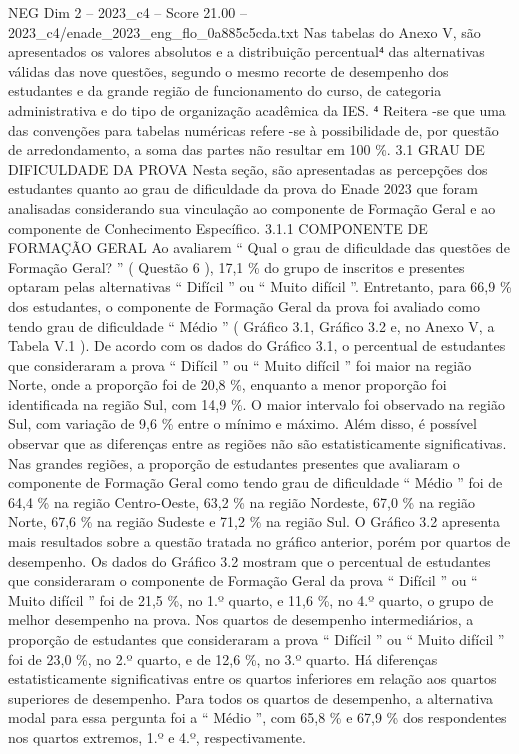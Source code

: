 \begin{textsample}{NEG Dim 2 – 2023\_c4 – Score 21.00 – 2023\_c4/enade\_2023\_eng\_flo\_0a885c5cda.txt}
Nas tabelas do Anexo V, são apresentados os valores absolutos e a distribuição percentual⁴ das alternativas válidas das nove questões, segundo o mesmo recorte de desempenho dos estudantes e da grande região de funcionamento do curso, de categoria administrativa e do tipo de organização acadêmica da IES. ⁴ Reitera -se que uma das convenções para tabelas numéricas refere -se à possibilidade de, por questão de arredondamento, a soma das partes não resultar em 100 \%. 3.1 GRAU DE DIFICULDADE DA PROVA Nesta seção, são apresentadas as percepções dos estudantes quanto ao grau de dificuldade da prova do Enade 2023 que foram analisadas considerando sua vinculação ao componente de Formação Geral e ao componente de Conhecimento Específico. 3.1.1 COMPONENTE DE FORMAÇÃO GERAL Ao avaliarem “ Qual o grau de dificuldade das questões de Formação Geral? ” ( Questão 6 ), 17,1 \% do grupo de inscritos e presentes optaram pelas alternativas “ Difícil ” ou “ Muito difícil ”.
Entretanto, para 66,9 \% dos estudantes, o componente de Formação Geral da prova foi avaliado como tendo grau de dificuldade “ Médio ” ( Gráfico 3.1, Gráfico 3.2 e, no Anexo V, a Tabela V.1 ).
De acordo com os dados do Gráfico 3.1, o percentual de estudantes que consideraram a prova “ Difícil ” ou “ Muito difícil ” foi maior na região Norte, onde a proporção foi de 20,8 \%, enquanto a menor proporção foi identificada na região Sul, com 14,9 \%.
O maior intervalo foi observado na região Sul, com variação de 9,6 \% entre o mínimo e máximo.
Além disso, é possível observar que as diferenças entre as regiões não são estatisticamente significativas.
Nas grandes regiões, a proporção de estudantes presentes que avaliaram o componente de Formação Geral como tendo grau de dificuldade “ Médio ” foi de 64,4 \% na região Centro-Oeste, 63,2 \% na região Nordeste, 67,0 \% na região Norte, 67,6 \% na região Sudeste e 71,2 \% na região Sul.
O Gráfico 3.2 apresenta mais resultados sobre a questão tratada no gráfico anterior, porém por quartos de desempenho.
Os dados do Gráfico 3.2 mostram que o percentual de estudantes que consideraram o componente de Formação Geral da prova “ Difícil ” ou “ Muito difícil ” foi de 21,5 \%, no 1.º quarto, e 11,6 \%, no 4.º quarto, o grupo de melhor desempenho na prova.
Nos quartos de desempenho intermediários, a proporção de estudantes que consideraram a prova “ Difícil ” ou “ Muito difícil ” foi de 23,0 \%, no 2.º quarto, e de 12,6 \%, no 3.º quarto.
Há diferenças estatisticamente significativas entre os quartos inferiores em relação aos quartos superiores de desempenho.
Para todos os quartos de desempenho, a alternativa modal para essa pergunta foi a “ Médio ”, com 65,8 \% e 67,9 \% dos respondentes nos quartos extremos, 1.º e 4.º, respectivamente.

\end{textsample}

